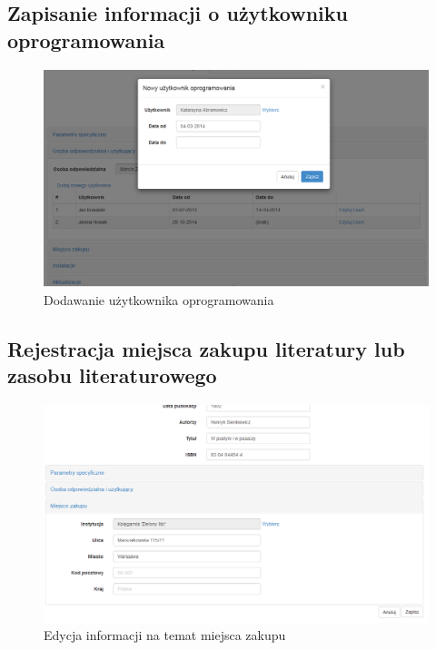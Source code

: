 \subsection{Zapisanie informacji o użytkowniku oprogramowania}
\begin{figure}[h!]
	\centering
	\includegraphics[scale=0.4]{img/screens/nowyUzytkownikOprogramowania.png}
	\caption{Dodawanie użytkownika oprogramowania}
\end{figure}

\subsection{Rejestracja miejsca zakupu literatury lub zasobu literaturowego}
\begin{figure}[h!]
	\centering
	\includegraphics[scale=0.4]{img/screens/miejsceZakupuLiteratura.png}
	\caption{Edycja informacji na temat miejsca zakupu}
\end{figure}

